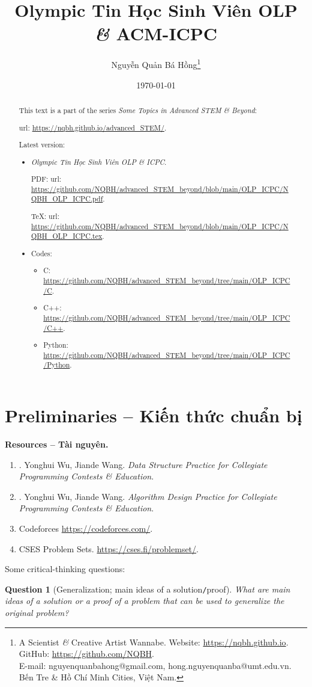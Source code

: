 \documentclass{article}
\title{Olympic Tin Học Sinh Viên OLP {\it\&} ACM-ICPC}
\author{Nguyễn Quản Bá Hồng\footnote{A Scientist {\it\&} Creative Artist Wannabe. Website: \url{https://nqbh.github.io}. GitHub: \url{https://github.com/NQBH}.\\E-mail: {\sf nguyenquanbahong@gmail.com, hong.nguyenquanba@umt.edu.vn}. Bến Tre \& Hồ Chí Minh Cities, Việt Nam.}}
\date{\today}
\newtheorem{question}{Question}
\begin{document}
\maketitle
\begin{abstract}
	This text is a part of the series {\it Some Topics in Advanced STEM \& Beyond}:
	
	{\sc url}: \url{https://nqbh.github.io/advanced_STEM/}.
	
	Latest version:
	\begin{itemize}
		\item {\it Olympic Tin Học Sinh Viên OLP \& ICPC}.
		
		PDF: {\sc url}: \url{https://github.com/NQBH/advanced_STEM_beyond/blob/main/OLP_ICPC/NQBH_OLP_ICPC.pdf}.
		
		\TeX: {\sc url}: \url{https://github.com/NQBH/advanced_STEM_beyond/blob/main/OLP_ICPC/NQBH_OLP_ICPC.tex}.
		\item Codes:
		\begin{itemize}
			\item C: \url{https://github.com/NQBH/advanced_STEM_beyond/tree/main/OLP_ICPC/C}.
			\item C++: \url{https://github.com/NQBH/advanced_STEM_beyond/tree/main/OLP_ICPC/C++}.
			\item Python: \url{https://github.com/NQBH/advanced_STEM_beyond/tree/main/OLP_ICPC/Python}.
		\end{itemize}
	\end{itemize}
\end{abstract}
\tableofcontents


\section*{Preliminaries -- Kiến thức chuẩn bị}
\textbf{\textsf{Resources -- Tài nguyên.}}
\begin{enumerate}
	\item \cite{Wu_Wang2016}. {\sc Yonghui Wu, Jiande Wang}. {\it Data Structure Practice for Collegiate Programming Contests \& Education}.
	\item \cite{Wu_Wang2018}. {\sc Yonghui Wu, Jiande Wang}. {\it Algorithm Design Practice for Collegiate Programming Contests \& Education}.	
	\item Codeforces \url{https://codeforces.com/}.
	\item CSES Problem Sets. \url{https://cses.fi/problemset/}.
\end{enumerate}
Some critical-thinking questions:
\begin{question}[Generalization; main ideas of a solution{\tt/}proof]
	What are main ideas of a solution or a proof of a problem that can be used to generalize the original problem?
\end{question}
\end{document}
